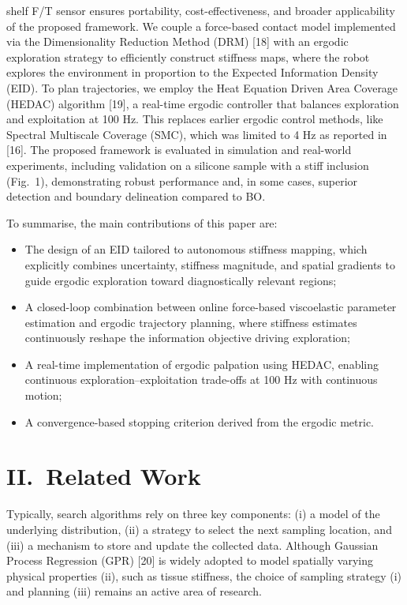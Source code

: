 \documentclass[11pt]{article}
\begin{document}
shelf F/T sensor ensures portability, cost-effectiveness, and broader
applicability of the proposed framework. We couple a force-based
contact model implemented via the Dimensionality Reduction Method
(DRM) [18] with an ergodic exploration strategy to efficiently
construct stiffness maps, where the robot explores the environment
in proportion to the Expected Information Density (EID). To plan
trajectories, we employ the Heat Equation Driven Area Coverage
(HEDAC) algorithm [19], a real-time ergodic controller that balances
exploration and exploitation at 100 Hz. This replaces earlier ergodic
control methods, like Spectral Multiscale Coverage (SMC), which was
limited to 4 Hz as reported in [16]. The proposed framework is
evaluated in simulation and real-world experiments, including
validation on a silicone sample with a stiff inclusion (Fig.~1),
demonstrating robust performance and, in some cases, superior
detection and boundary delineation compared to BO.

To summarise, the main contributions of this paper are:
\begin{itemize}
\item The design of an EID tailored to autonomous stiffness mapping,
  which explicitly combines uncertainty, stiffness magnitude, and
  spatial gradients to guide ergodic exploration toward diagnostically
  relevant regions;
\item A closed-loop combination between online force-based
  viscoelastic parameter estimation and ergodic trajectory planning,
  where stiffness estimates continuously reshape the information
  objective driving exploration;
\item A real-time implementation of ergodic palpation using HEDAC,
  enabling continuous exploration--exploitation trade-offs at 100 Hz
  with continuous motion;
\item A convergence-based stopping criterion derived from the
  ergodic metric.
\end{itemize}

\section*{II.\ Related Work}

Typically, search algorithms rely on three key components: (i) a
model of the underlying distribution, (ii) a strategy to select the
next sampling location, and (iii) a mechanism to store and update the
collected data. Although Gaussian Process Regression (GPR) [20] is
widely adopted to model spatially varying physical properties (ii),
such as tissue stiffness, the choice of sampling strategy (i) and
planning (iii) remains an active area of research.
\end{document}
